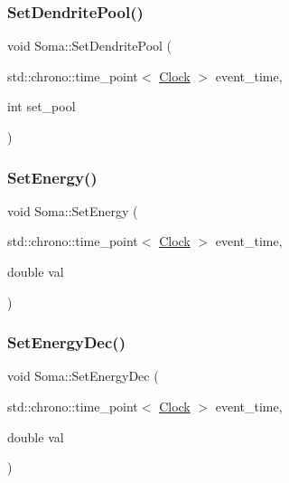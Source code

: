 \subsubsection{\texorpdfstring{Set\+Dendrite\+Pool()}{SetDendritePool()}}
{\footnotesize\ttfamily void Soma\+::\+Set\+Dendrite\+Pool (\begin{DoxyParamCaption}\item[{std\+::chrono\+::time\+\_\+point$<$ \mbox{\hyperlink{universe_8h_a0ef8d951d1ca5ab3cfaf7ab4c7a6fd80}{Clock}} $>$}]{event\+\_\+time,  }\item[{int}]{set\+\_\+pool }\end{DoxyParamCaption})\hspace{0.3cm}{\ttfamily [inline]}}

\mbox{\label{classSoma_a0d1c0271fc8eeacd6e8836f751dff331}} 
\subsubsection{\texorpdfstring{Set\+Energy()}{SetEnergy()}}
{\footnotesize\ttfamily void Soma\+::\+Set\+Energy (\begin{DoxyParamCaption}\item[{std\+::chrono\+::time\+\_\+point$<$ \mbox{\hyperlink{universe_8h_a0ef8d951d1ca5ab3cfaf7ab4c7a6fd80}{Clock}} $>$}]{event\+\_\+time,  }\item[{double}]{val }\end{DoxyParamCaption})\hspace{0.3cm}{\ttfamily [inline]}}

\mbox{\label{classSoma_a37081f7a8fc7832f8e89629221ddb8a6}} 
\subsubsection{\texorpdfstring{Set\+Energy\+Dec()}{SetEnergyDec()}}
{\footnotesize\ttfamily void Soma\+::\+Set\+Energy\+Dec (\begin{DoxyParamCaption}\item[{std\+::chrono\+::time\+\_\+point$<$ \mbox{\hyperlink{universe_8h_a0ef8d951d1ca5ab3cfaf7ab4c7a6fd80}{Clock}} $>$}]{event\+\_\+time,  }\item[{double}]{val }\end{DoxyParamCaption})\hspace{0.3cm}{\ttfamily [inline]}}

